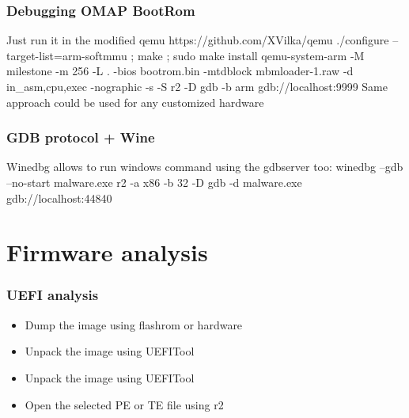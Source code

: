 \documentclass[10pt,pdf,utf8,english,compress,hyperref={unicode}]{beamer}
\begin{document}
\begin{frame}[fragile]
  \frametitle{Debugging OMAP BootRom}
  \center Just run it in the modified qemu https://github.com/XVilka/qemu
  \center ./configure --target-list=arm-softmmu ; make ; sudo make install
  \center qemu-system-arm -M milestone -m 256 -L . -bios bootrom.bin -mtdblock	mbmloader-1.raw -d in\_asm,cpu,exec -nographic -s -S
  \center r2 -D gdb -b arm gdb://localhost:9999
  \center Same approach could be used for any customized hardware
\end{frame}


\begin{frame}[fragile]
  \frametitle{GDB protocol + Wine}
  \center Winedbg allows to run windows command
  \center using the gdbserver too:
  \center winedbg --gdb --no-start malware.exe
  \center r2 -a x86 -b 32 -D gdb -d malware.exe gdb://localhost:44840
\end{frame}

\section{Firmware analysis}
\begin{frame}[fragile]
  \frametitle{UEFI analysis}
  \begin{itemize}
    \item Dump the image using flashrom or hardware
\ifxetex
	\item Unpack the image using UEFITool
\else
	\item Unpack the image using UEFITool 
\fi
	\item Open the selected PE or TE file using r2
  \end{itemize}
\end{frame}

\end{document}
